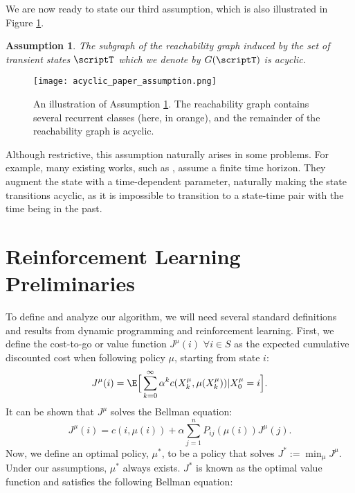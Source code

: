 \documentclass[12pt]{article}
\newtheorem{assumption}{Assumption}
\begin{document}
We are now ready to state our third assumption, which is also illustrated in Figure \ref{fig:assumption_acyclic}.

\begin{assumption}\label{assumption_acyclic_transient}
The subgraph of the reachability graph induced by the set of transient states $\scriptT$ which we denote by $G(\scriptT)$ is acyclic.
\end{assumption}

\begin{figure}
    \centering
    \texttt{[image: acyclic\_paper\_assumption.png]}
    \caption{An illustration of Assumption \ref{assumption_acyclic_transient}. The reachability graph contains several recurrent classes (here, in orange), and the remainder of the reachability graph is acyclic.}
    \label{fig:assumption_acyclic}
\end{figure}

Although restrictive, this assumption naturally arises in some problems. For example, many existing works, such as \cite{Jordan}, assume a finite time horizon. They augment the state with a time-dependent parameter, naturally making the state transitions acyclic, as it is impossible to transition to a state-time pair with the time being in the past.

\section{Reinforcement Learning Preliminaries}\label{RLPre}
To define and analyze our algorithm, we will need several standard definitions and results from dynamic programming and reinforcement learning. First, we define the cost-to-go or value function $J^{\mu}(i)$ $\forall i \in S$ as the expected  cumulative discounted cost when following policy $\mu$, starting from state $i$:
\begin{align*}
J^{\mu} (i)= \E \Big [ \sum_{k = 0}^\infty \alpha^k c(X_k^{\mu}, \mu(X_k^{\mu})) | X_0^{\mu} = i \Big ]. %
\end{align*}
It can be shown that $J^{\mu}$  solves the Bellman equation:
\begin{equation}
	J^{\mu}(i) = c(i, \mu(i)) + \alpha \sum_{j=1}^n P_{ij}(\mu(i)) J^\mu(j). \label{eq:bellmaneq}
\end{equation}
Now, we define an optimal policy, $\mu^*$, to be a policy that solves $J^*:=\min_\mu J^\mu$. Under our assumptions, $\mu^*$ always exists. $J^*$ is known as the optimal value function and satisfies the following Bellman equation:
\end{document}
